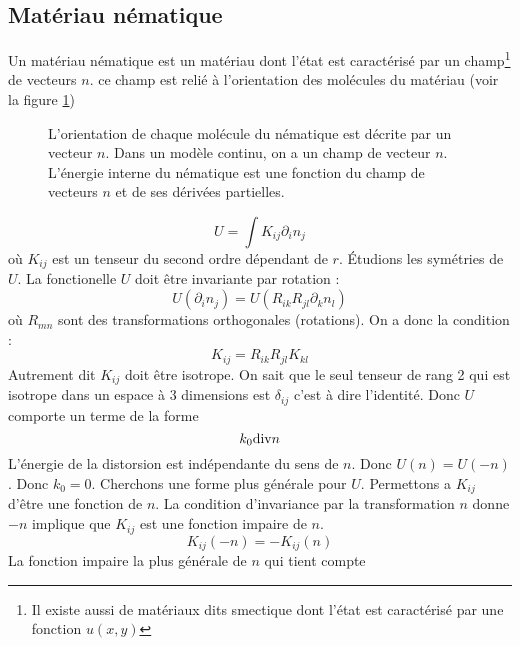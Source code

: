 \documentclass[12pt]{book}
\begin{document}
\subsection{Mat\'eriau n\'ematique}\label{secenernema}
Un mat\'eriau n\'ematique est un mat\'eriau
\cite{ph:liqcr:DeGennes74} dont 
l'\'etat est caract\'eris\'e par un champ\footnote{Il existe aussi de
mat\'eriaux dits smectique dont l'\'etat est caract\'eris\'e par une
fonction $u(x,y)$} de vecteurs $n$. ce champ est reli\'e \`a
l'orientation des mol\'ecules du mat\'eriau (voir la figure
\ref{figchampnema})
\begin{figure}[htb]
 \centerline{}   
 \caption{L'orientation de chaque mol\'ecule du n\'ematique est
d\'ecrite par un vecteur $n$. Dans un mod\`ele continu, on a un champ
de vecteur $n$. L'\'energie interne du n\'ematique est une fonction du
champ de vecteurs $n$ et de ses d\'eriv\'ees partielles.}
 \label{figchampnema}
\end{figure}
\begin{equation}
U=\int K_{ij} \partial_i n_j
\end{equation}
o\`u $K_{ij}$ est un tenseur du second ordre d\'ependant de $r$.
\'Etudions les sym\'etries de $U$.
La fonctionelle $U$ doit \^etre invariante par rotation :
\begin{equation}
U(\partial_i n_j)=U(R_{ik}R_{jl}\partial_k n_l)
\end{equation}
o\`u $R_{mn}$ sont des transformations orthogonales (rotations).
On a donc la condition :
\begin{equation}
K_{ij}=R_{ik}R_{jl}K_{kl}
\end{equation}
Autrement dit $K_{ij}$ doit \^etre isotrope.
On sait que le seul tenseur de rang 2 qui est isotrope 
dans un espace \`a 3 dimensions est $\delta_{ij}$ 
c'est \`a dire l'identit\'e.
Donc $U$ comporte un terme de la forme
\begin{equation}
k_0{\rm div} n
\end{equation}
L'\'energie de la distorsion est ind\'ependante du sens de $n$.
Donc $U(n)=U(-n)$.
Donc $k_0=0$.
Cherchons une forme plus g\'en\'erale pour $U$. Permettons a 
$K_{ij}$ d'\^etre une fonction de $n$.
La condition d'invariance par la transformation $n$ donne
$-n$ implique que $K_{ij}$ est une fonction impaire de $n$.
\begin{equation}
K_{ij}(-n)=-K_{ij}(n)
\end{equation}
La fonction impaire la plus g\'en\'erale de $n$ qui tient compte 
\end{document}
